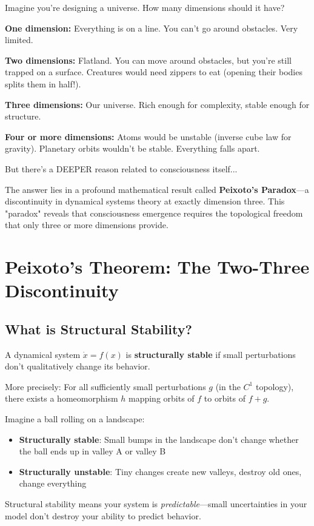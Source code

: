 \begin{intuitive}
Imagine you're designing a universe. How many dimensions should it have?

\textbf{One dimension:} Everything is on a line. You can't go around obstacles. Very limited.

\textbf{Two dimensions:} Flatland. You can move around obstacles, but you're still trapped on a surface. Creatures would need zippers to eat (opening their bodies splits them in half!).

\textbf{Three dimensions:} Our universe. Rich enough for complexity, stable enough for structure.

\textbf{Four or more dimensions:} Atoms would be unstable (inverse cube law for gravity). Planetary orbits wouldn't be stable. Everything falls apart.

But there's a DEEPER reason related to consciousness itself...
\end{intuitive}

The answer lies in a profound mathematical result called \textbf{Peixoto's Paradox}—a discontinuity in dynamical systems theory at exactly dimension three. This "paradox" reveals that consciousness emergence requires the topological freedom that only three or more dimensions provide.

\section{Peixoto's Theorem: The Two-Three Discontinuity}

\subsection{What is Structural Stability?}

\begin{defn}\label{def:structural-stability}
A dynamical system $\dot{x} = f(x)$ is \textbf{structurally stable} if small perturbations don't qualitatively change its behavior.

More precisely: For all sufficiently small perturbations $g$ (in the $C^1$ topology), there exists a homeomorphism $h$ mapping orbits of $f$ to orbits of $f + g$.
\end{defn}

\begin{intuitive}
Imagine a ball rolling on a landscape:
\begin{itemize}
\item \textbf{Structurally stable}: Small bumps in the landscape don't change whether the ball ends up in valley A or valley B
\item \textbf{Structurally unstable}: Tiny changes create new valleys, destroy old ones, change everything
\end{itemize}

Structural stability means your system is \textit{predictable}—small uncertainties in your model don't destroy your ability to predict behavior.
\end{intuitive}


